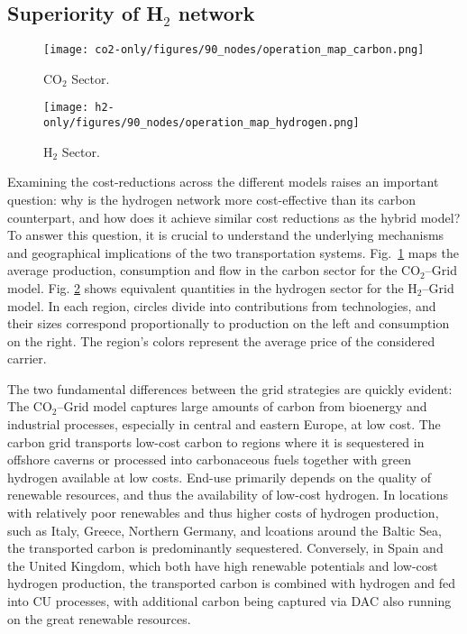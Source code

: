 \documentclass[twocolumn]{article}
\newcommand{\carbon}{CO$_2$}
\newcommand{\hydrogen}{H$_2$}
\newcommand{\carbongrid}{\carbon{}--Grid}
\newcommand{\hydrogengrid}{\hydrogen{}--Grid}
\begin{document}
\subsection*{Superiority of \hydrogen{} network}

\begin{figure*}[ht!]
    \centering
    \begin{subfigure}{0.9\linewidth}
        \centering
        \texttt{[image: co2-only/figures/90\_nodes/operation\_map\_carbon.png]}
        \caption{\carbon{} Sector.}
        \label{fig:operation_map_carbon}
    \end{subfigure}
    \begin{subfigure}{0.9\linewidth}
        \centering
        \texttt{[image: h2-only/figures/90\_nodes/operation\_map\_hydrogen.png]}
        \caption{\hydrogen{} Sector.}
        \label{fig:operation_map_hydrogen}
    \end{subfigure}
    \caption{Optimal operation per sector for a net-zero energy system in Europe with average production on the left and average consumption on the right for both, (a) the \carbon{} sector in the \carbon{}-Grid model and (b) the \hydrogen{} sector in the \hydrogen-Grid model.}
    \label{fig:operation_map}
\end{figure*}


Examining the cost-reductions across the different models raises an important question: why is the hydrogen network more cost-effective than its carbon counterpart, and how does it achieve similar cost reductions as the hybrid model? To answer this question, it is crucial to understand the underlying mechanisms and geographical implications of the two transportation systems. Fig.~\ref{fig:operation_map_carbon} maps the average production, consumption and flow in the carbon sector for the \carbongrid{} model. Fig. \ref{fig:operation_map_hydrogen} shows equivalent quantities in the hydrogen sector for the \hydrogengrid{} model. In each region, circles divide into contributions from technologies, and their sizes correspond proportionally to production on the left and consumption on the right. The region's colors represent the average price of the considered carrier.

The two fundamental differences between the grid strategies are quickly evident: The \carbongrid{} model captures large amounts of carbon from bioenergy and industrial processes, especially in central and eastern Europe, at low cost. The carbon grid transports low-cost carbon to regions where it is sequestered in offshore caverns or processed into carbonaceous fuels together with green hydrogen available at low costs. End-use primarily depends on the quality of renewable resources, and thus the availability of low-cost hydrogen. In locations with relatively poor renewables and thus higher costs of hydrogen production, such as Italy, Greece, Northern Germany, and lcoations around the Baltic Sea, the transported carbon is predominantly sequestered. Conversely, in Spain and the United Kingdom, which both have high renewable potentials and low-cost hydrogen production, the transported carbon is combined with hydrogen and fed into CU processes, with additional carbon being captured via DAC also running on the great renewable resources.
\end{document}
